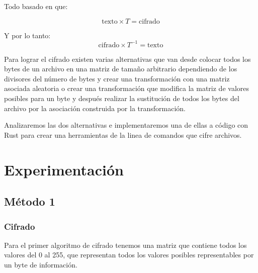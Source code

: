 \documentclass[a4paper]{article}
\begin{document}
Todo basado en que:

\[
\text{texto} \times T = \text{cifrado}
\]

Y por lo tanto:
\[
\text{cifrado} \times T^{-1} = \text{texto}
\]

Para lograr el cifrado existen varias alternativas que van desde colocar todos
los bytes de un archivo en una matriz de tamaño arbitrario dependiendo de los
divisores del número de bytes y crear una transformación con una matriz
asociada aleatoria o crear una transformación que modifica la matriz de valores
posibles para un byte y después realizar la sustitución de todos los bytes del
archivo por la asociación construida por la transformación.

Analizaremos las dos alternativas e implementaremos una de ellas a código con
Rust para crear una herramientas de la linea de comandos que cifre archivos.

\newpage
\section{Experimentación}

\subsection{Método 1}

\subsubsection{Cifrado}
Para el primer algoritmo de cifrado tenemos una matriz que contiene todos los
valores del 0 al 255, que representan todos los valores posibles representables
por un byte de información.
\end{document}
